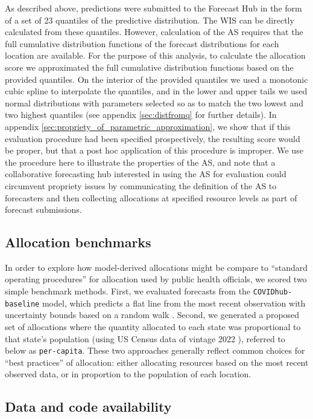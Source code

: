 \documentclass{article}\usepackage[]{graphicx}\usepackage[]{xcolor}
\begin{document}
As described above, predictions were submitted to the Forecast Hub in the form of a set of 23 quantiles of the
predictive distribution. The WIS can be directly calculated from these quantiles. However, calculation of the AS
requires that the full cumulative distribution functions of the forecast distributions for each location are available.
For the purpose of this analysis, to calculate the allocation score we approximated the full cumulative distribution
functions based on the provided quantiles. On the interior of the provided quantiles we used a monotonic cubic spline to
interpolate the quantiles, and in the lower and upper tails we used normal distributions with parameters selected so as
to match the two lowest and two highest quantiles (see appendix \ref{sec:distfromq} for further details).
In appendix \ref{sec:propriety_of_parametric_approximation}, we show that if this evaluation procedure
had been specified prospectively, the resulting score would be proper, \textemdash but that a post hoc application of this
procedure is improper. We use the procedure here to illustrate the properties of the AS, and note that a collaborative
forecasting hub interested in using the AS for evaluation could circumvent propriety issues by communicating the
definition of the AS to forecasters and then collecting allocations at specified resource levels as part of forecast
submissions.

\subsection{Allocation benchmarks}

In order to explore how model-derived allocations might be compare to ``standard operating procedures'' for allocation
used by public health officials, we scored two simple benchmark methods. First, we evaluated forecasts from the
\texttt{COVIDhub-baseline} model, which predicts a flat line from the most recent observation with uncertainty bounds
based on a random walk \citep{cramer_evaluation_2022}. Second, we generated a proposed set of allocations where the
quantity allocated to each state was proportional to that state's population (using US Census data of vintage 2022
\citep{us_census_nst_est2022}), referred to below as \texttt{per-capita}. These two approaches generally reflect common
choices for ``best practices'' of allocation: either allocating resources based on the most recent observed data, or in
proportion to the population of each location. 

\subsection{Data and code availability}
\end{document}
